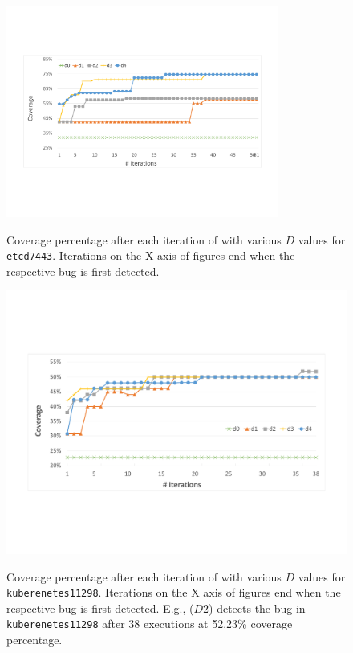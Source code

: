 \begin{figure}[]
   \centering
   \includegraphics[width=0.8\textwidth]{goat/figs/coverage_etcd7443.pdf}
   \label{fig:etcd_coverage}
   \caption{Coverage percentage after each iteration of \goat with various $D$ values for \texttt{etcd7443}. Iterations on the X axis of figures end when the respective bug is first detected.}
   \label{fig:coverage}

\end{figure}

\begin{figure}[t]

       \centering
       \includegraphics[width=.8\textwidth]{goat/figs/coverage_kubernetes11298.pdf}
       \label{fig:kubernetes_coverage}
       \caption{Coverage percentage after each iteration of \goat with various $D$ values for \texttt{kuberenetes11298}. Iterations on the X axis of figures end when the respective bug is first detected. E.g., \goat($D2$) detects the bug in \texttt{kuberenetes11298} after 38 executions at 52.23\% coverage percentage.}
       \label{fig:coverage}

\end{figure}




